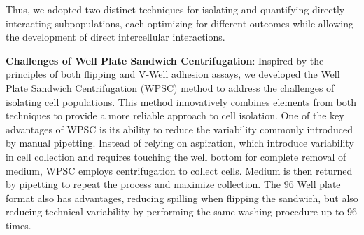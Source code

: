 Thus, we adopted two distinct techniques for isolating and quantifying directly
interacting subpopulations, each optimizing for different outcomes while
allowing the development of direct intercellular interactions.












\textbf{Challenges of Well Plate Sandwich Centrifugation}: Inspired by the
principles of both flipping and V-Well adhesion assays, we developed the Well
Plate Sandwich Centrifugation (\acf{WPSC}) method to address the challenges of
isolating cell populations. This method innovatively combines elements from both
techniques to provide a more reliable approach to cell isolation. One of the key
advantages of WPSC is its ability to reduce the variability commonly introduced
by manual pipetting. Instead of relying on aspiration, which introduce
variability in cell collection and requires touching the well bottom for
complete removal of medium, WPSC employs centrifugation to collect cells. Medium
is then returned by pipetting to repeat the process and maximize \nMAina
collection. The 96 Well plate format also has advantages, reducing spilling when
flipping the sandwich, but also reducing technical variability by performing the
same washing procedure up to 96 times.

